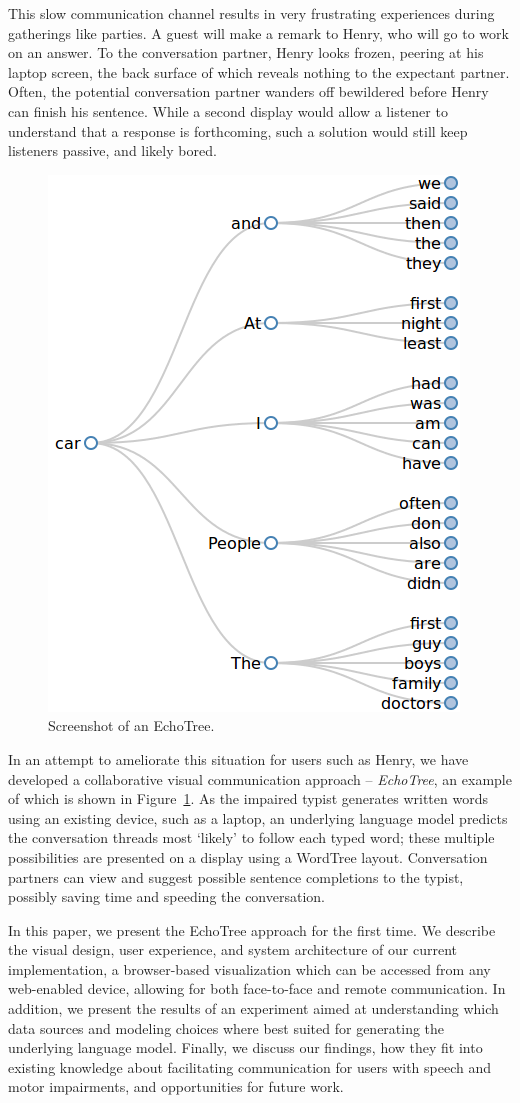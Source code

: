 \documentclass{sigchi}
\begin{document}
This slow communication channel results in very frustrating experiences during gatherings like parties. A guest will make a remark to Henry, who will go to work on an answer. To the conversation partner, Henry looks frozen, peering at his laptop screen, the back surface of which reveals nothing to the expectant partner. Often, the potential conversation partner wanders off bewildered before Henry can finish his sentence. While a second display would allow a listener to understand that a response is forthcoming, such a solution would still keep listeners passive, and likely bored.

\begin{figure}
   \centering
   \includegraphics[width=0.6\columnwidth]{Figs/henryBigramsCarTree.png}
   \caption{Screenshot of an EchoTree.}
   \label{fig:echoTree}
\end{figure}

In an attempt to ameliorate this situation for users such as Henry, we have developed a collaborative visual communication approach -- {\em EchoTree}, an example of which is shown in Figure~\ref{fig:echoTree}. As the impaired typist generates written words using an existing device, such as a laptop, an underlying language model predicts the conversation threads most ‘likely’ to follow each typed word; these multiple possibilities are presented on a display using a WordTree\cite{Wattenberg2008} layout. Conversation partners can view and suggest possible sentence completions to the typist, possibly saving time and speeding the conversation.

In this paper, we present the EchoTree approach for the first time. We describe the visual design, user experience, and system architecture of our current implementation, a browser-based visualization which can be accessed from any web-enabled device, allowing for both face-to-face and remote communication. In addition, we present the results of an experiment aimed at understanding which data sources and modeling choices where best suited for generating the underlying language model. Finally, we discuss our findings, how they fit into existing knowledge about facilitating communication for users with speech and motor impairments, and opportunities for future work.
\end{document}
